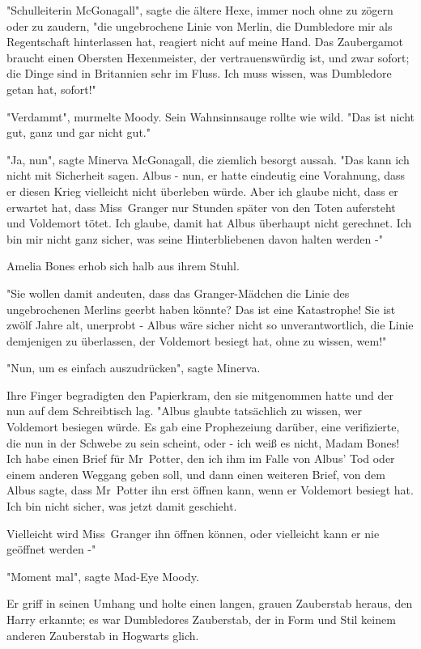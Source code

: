 {"Schulleiterin McGonagall", sagte die ältere Hexe, immer noch ohne zu zögern oder zu zaudern, "die ungebrochene Linie von Merlin, die Dumbledore mir als Regentschaft hinterlassen hat, reagiert nicht auf meine Hand. Das Zaubergamot braucht einen Obersten Hexenmeister, der vertrauenswürdig ist, und zwar sofort; die Dinge sind in Britannien sehr im Fluss. Ich muss wissen, was Dumbledore getan hat, sofort!"

"Verdammt", murmelte Moody. Sein Wahnsinnsauge rollte wie wild. "Das ist nicht gut, ganz und gar nicht gut."

"Ja, nun", sagte Minerva McGonagall, die ziemlich besorgt aussah. "Das kann ich nicht mit Sicherheit sagen. Albus - nun, er hatte eindeutig eine Vorahnung, dass er diesen Krieg vielleicht nicht überleben würde. Aber ich glaube nicht, dass er erwartet hat, dass Miss~Granger nur Stunden später von den Toten aufersteht und Voldemort tötet. Ich glaube, damit hat Albus überhaupt nicht gerechnet. Ich bin mir nicht ganz sicher, was seine Hinterbliebenen davon halten werden -"

Amelia Bones erhob sich halb aus ihrem Stuhl.

"Sie wollen damit andeuten, dass das Granger-Mädchen die Linie des ungebrochenen Merlins geerbt haben könnte? Das ist eine Katastrophe! Sie ist zwölf Jahre alt, unerprobt - Albus wäre sicher nicht so unverantwortlich, die Linie demjenigen zu überlassen, der Voldemort besiegt hat, ohne zu wissen, wem!"

"Nun, um es einfach auszudrücken", sagte Minerva.

Ihre Finger begradigten den Papierkram, den sie mitgenommen hatte und der nun auf dem Schreibtisch lag. "Albus glaubte tatsächlich zu wissen, wer Voldemort besiegen würde. Es gab eine Prophezeiung darüber, eine verifizierte, die nun in der Schwebe zu sein scheint, oder - ich weiß es nicht, Madam Bones! Ich habe einen Brief für Mr~Potter, den ich ihm im Falle von Albus' Tod oder einem anderen Weggang geben soll, und dann einen weiteren Brief, von dem Albus sagte, dass Mr~Potter ihn erst öffnen kann, wenn er Voldemort besiegt hat. Ich bin nicht sicher, was jetzt damit geschieht.

Vielleicht wird Miss~Granger ihn öffnen können, oder vielleicht kann er nie geöffnet werden -"

"Moment mal", sagte Mad-Eye Moody.

Er griff in seinen Umhang und holte einen langen, grauen Zauberstab heraus, den Harry erkannte; es war Dumbledores Zauberstab, der in Form und Stil keinem anderen Zauberstab in Hogwarts glich.

}
